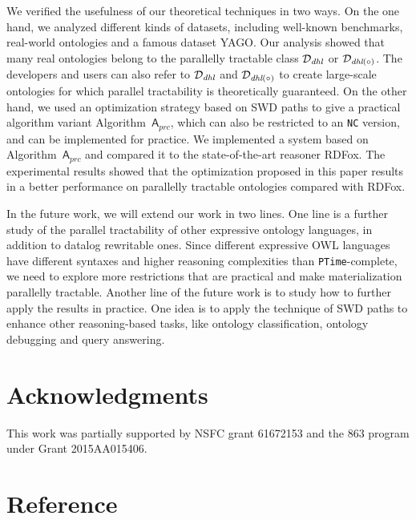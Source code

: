 \documentclass[final,1p,times]{elsarticle}
\begin{document}
We verified the usefulness of our theoretical techniques in two ways. On the one hand,
we analyzed different kinds of datasets,
including well-known benchmarks, real-world ontologies and a famous dataset YAGO.
Our analysis showed that many real ontologies belong to
the parallelly tractable class $\mathcal{D}_{\textit{\text{dhl}}}$
or $\mathcal{D}_{\textit{\text{dhl}}(\circ)}$. The
developers and users can also refer to $\mathcal{D}_{\textit{\text{dhl}}}$
and $\mathcal{D}_{\textit{\text{dhl}}(\circ)}$
to create large-scale ontologies for which parallel tractability
is theoretically guaranteed. On the other hand,
we used an optimization strategy based on SWD paths
to give a practical algorithm variant Algorithm~$\mathsf{A}_{prc}$, which can
also be restricted to an \texttt{NC} version, and can be implemented for practice.
We implemented a system based on Algorithm~$\mathsf{A}_{prc}$ and compared it to
the state-of-the-art reasoner RDFox.
The experimental results showed that the optimization proposed in this paper results
in a better performance on parallelly tractable ontologies compared with RDFox.

In the future work, we will extend our work in two lines.
One line is a further study of the parallel tractability of
other expressive ontology languages, in addition to
datalog rewritable ones. Since different expressive OWL languages
have different syntaxes and higher reasoning complexities than \texttt{PTime}-complete, we need to
explore more restrictions that are practical and make materialization
parallelly tractable. Another line of the future work is to
study how to further apply the
results in practice.
One idea is to apply the technique of SWD paths to enhance other reasoning-based tasks,
like ontology classification, ontology debugging and query answering.

\section*{Acknowledgments}

This work was partially supported by NSFC
grant 61672153 and the 863 program under Grant
2015AA015406.

\section*{Reference}




\clearpage
\end{document}

